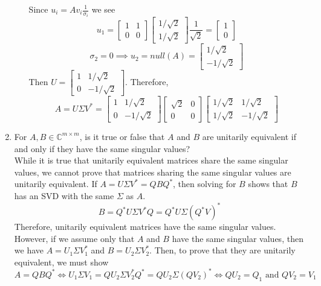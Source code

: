 \documentclass[12pt]{article}
\numberwithin{equation}{section}
\begin{document}
\begin{enumerate}
\begin{enumerate}
    Since $u_i=Av_i\frac{1}{\sigma_i}$ we see
    $$u_1=\left[\begin{array}{cc}1&1\\0&0\end{array}\right]\left[\begin{array}{c}1/\sqrt{2}\\1/\sqrt{2}\end{array}\right]\frac{1}{\sqrt{2}}=\left[\begin{array}{c}1\\0\end{array}\right]$$
    $$\sigma_2=0\implies u_2=null(A)=\left[\begin{array}{c}1/\sqrt{2}\\-1/\sqrt{2}\end{array}\right]$$
    Then $U=\left[\begin{array}{cc}1&1/\sqrt{2}\\0&-1/\sqrt{2}\end{array}\right]$. Therefore,
    $$A=U\Sigma V^*=\left[\begin{array}{cc}1&1/\sqrt{2}\\0&-1/\sqrt{2}\end{array}\right]\left[\begin{array}{cc}\sqrt{2}&0\\0&0\end{array}\right]\left[\begin{array}{cc}1/\sqrt{2}&1/\sqrt{2}\\1/\sqrt{2}&-1/\sqrt{2}\end{array}\right]$$
    \end{enumerate}
\item For $A,B\in\mathbb{C}^{m\times m}$, is it true or false that $A$ and $B$ are unitarily equivalent if and only if they have the same singular values?\\
    While it is true that unitarily equivalent matrices share the same singular values, we cannot prove that matrices sharing the same singular values are unitarily equivalent. If $A=U\Sigma V^*=QBQ^*$, then solving for $B$ shows that $B$ has an SVD with the same $\Sigma$ as $A$.
    $$B=Q^*U\Sigma V^*Q=Q^*U\Sigma (Q^*V)^*$$
    Therefore, unitarily equivalent matrices have the same singular values. However, if we assume only that $A$ and $B$ have the same singular values, then we have $A=U_1\Sigma V_1^*$ and $B=U_2\Sigma V_2^*$. Then, to prove that they are unitarily equivalent, we must show
    $$A=QBQ^*\iff U_1\Sigma V_1=Q U_2\Sigma V_2^*Q^*=QU_2\Sigma (QV_2)^*\iff QU_2=Q_1\text{ and }QV_2=V_1$$

\end{enumerate}
\end{document}
